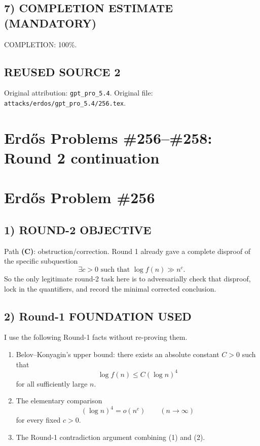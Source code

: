 \subsection*{7) COMPLETION ESTIMATE (MANDATORY)}
\noindent COMPLETION: 100\%.



\subsection*{REUSED SOURCE 2}
Original attribution: \texttt{gpt\_pro\_5.4}.
Original file: \texttt{attacks/erdos/gpt\_pro\_5.4/256.tex}.

\section*{Erd\H{o}s Problems \#256--\#258: Round 2 continuation}

\section*{Erd\H{o}s Problem \#256}

\subsection*{1) ROUND-2 OBJECTIVE}
Path \textbf{(C)}: obstruction/correction. Round 1 already gave a complete disproof of the specific subquestion
\[
\exists c>0\text{ such that }\log f(n)\gg n^c.
\]
So the only legitimate round-2 task here is to adversarially check that disproof, lock in the quantifiers, and record the minimal corrected conclusion.

\subsection*{2) Round-1 FOUNDATION USED}
I use the following Round-1 facts without re-proving them.
\begin{enumerate}
\item Belov--Konyagin's upper bound: there exists an absolute constant $C>0$ such that
\[
\log f(n)\le C(\log n)^4
\]
for all sufficiently large $n$.
\item The elementary comparison
\[
(\log n)^4=o(n^c)\qquad (n\to\infty)
\]
for every fixed $c>0$.
\item The Round-1 contradiction argument combining (1) and (2).
\end{enumerate}

